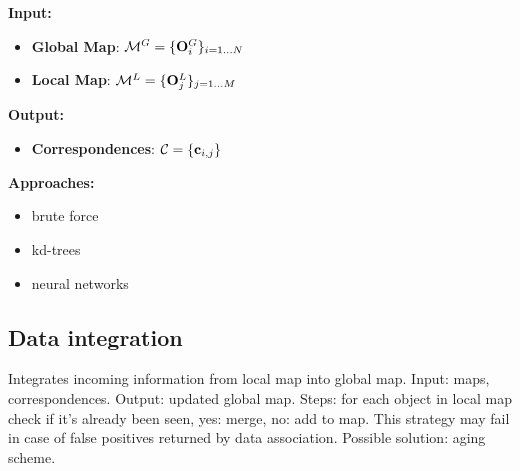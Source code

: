 \documentclass{article}
\begin{document}
	\hspace{1cm}
	
	\noindent
	{\bf Input: }
	\begin{itemize}
		\item {\bf Global Map}: $\mathcal{M}^G = \{ \mathbf{O}_i^G \}_{i=1 \dots N}$
		\item {\bf Local Map}: $\mathcal{M}^L = \{ \mathbf{O}_j^L \}_{j=1 \dots M}$
	\end{itemize}
	\noindent
	{\bf Output: }
	\begin{itemize}
		\item {\bf Correspondences}: $\mathcal{C} = \{ \mathbf{c}_{i,j}\}$		
	\end{itemize}
	\noindent
	{\bf Approaches: }
	\begin{itemize}
		\item brute force
		\item kd-trees
		\item neural networks
	\end{itemize}
		
	
	\subsection{Data integration} 
	
	Integrates incoming information from local map into global map. Input: maps, correspondences. Output: updated global map. Steps: for each object in local map check if it's already been seen, yes: merge, no: add to map. This strategy may fail in case of false positives returned by data association. Possible solution:  aging scheme.
	
\end{document}
